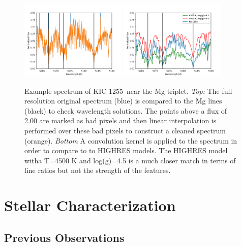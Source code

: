 \documentclass[twocolumn]{aastex61}
\newcommand{\shStar}{KIC 1255}
\begin{document}
\begin{figure}
\begin{centering}
\includegraphics[width=0.45\textwidth]{images/subaru/Mg_triplet_spec_interp.pdf}
\includegraphics[width=0.45\textwidth]{images/subaru/Mg_triplet_spec.pdf}
\caption{Example spectrum of \shStar\ near the Mg triplet.
{\it Top:} The full resolution original spectrum (blue) is compared to the Mg lines (black) to check wavelength solutions.
The points above a flux of 2.00 are marked as bad pixels and then linear interpolation is performed over these bad pixels to construct a cleaned spectrum (orange).
{\it Bottom} A convolution kernel is applied to the spectrum in order to compare to to HIGHRES models.
The HIGHRES model witha T=4500 K and log(g)=4.5 is a much closer match in terms of line ratios but not the strength of the features.}\label{fig:mgTriplet}
\end{centering}
\end{figure}

\section{Stellar Characterization}
\subsection{Previous Observations}
\end{document}
